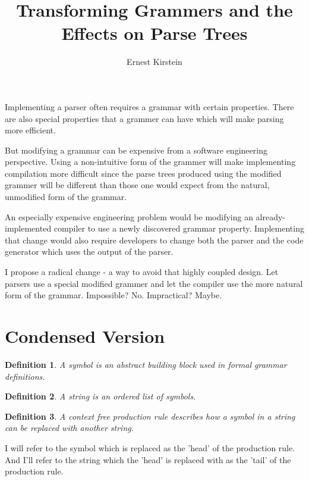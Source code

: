 \documentclass[11pt]{article}
\newtheorem{definition}{Definition}
\begin{document}
\title{Transforming Grammers and the Effects on Parse Trees}
\author{Ernest Kirstein}
\maketitle

Implementing a parser often requires a grammar with certain properties.
\cite{lewis, compiler}
There are also special properties that a grammer can have which will make
parsing more efficient. \cite{compiler, reghizzi}

But modifying a grammar can be expensive from a software engineering perspective.
Using a non-intuitive form of the grammer will make implementing compilation 
more difficult since the parse trees produced using the modified grammer will
be different than those one would expect from the natural, unmodified form of the
grammar.

An especially expensive engineering problem would be modifying an already-implemented
compiler to use a newly discovered grammar property. Implementing that change
would also require developers to change both the parser and the code generator
which uses the output of the parser.

I propose a radical change - a way to avoid that highly coupled design. Let parsers
use a special modified grammer and let the compiler use the more natural form of
the grammar. Impossible? No. Impractical? Maybe.

\section*{Condensed Version}

\begin{definition}
A {\em symbol} is an abstract building block used in formal grammar definitions.
\end{definition}

\begin{definition}
A {\em string} is an ordered list of symbols.
\end{definition}

\begin{definition}
A {\em context free production rule} describes how a symbol in
a string can be replaced with another string.
\end{definition}

I will refer to the symbol which is replaced as the 'head' of the production
rule. And I'll refer to the string which the 'head' is replaced with as the
'tail' of the production rule.
\end{document}

